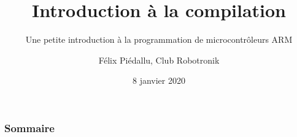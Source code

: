 \documentclass[8pt,a9paper]{beamer}
\title{Introduction à la compilation}
\subtitle{Une petite introduction à la programmation de microcontrôleurs ARM}
\date{8 janvier 2020}
\author{Félix Piédallu, Club Robotronik}
\newcommand{\…}{\dots}
\begin{document}
\begin{frame}
  \titlepage
\end{frame}

\begin{frame}
  \frametitle{\textbf{Sommaire}}
  \tableofcontents
\end{frame}




\end{document}
